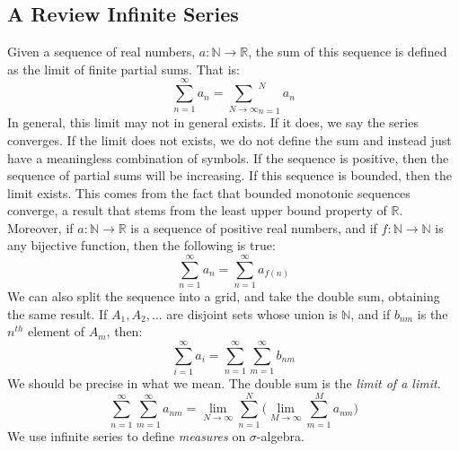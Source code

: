 \documentclass[crop=false,class=book,oneside]{standalone}
\begin{document}
        \subsection{A Review Infinite Series}
            Given a sequence of real numbers,
            $a:\mathbb{N}\rightarrow\mathbb{R}$, the sum of this
            sequence is defined as the limit of
            finite partial sums. That is:
            \begin{equation}
                \sum_{n=1}^{\infty}a_{n}=
                \underset{N\rightarrow\infty}\sum_{n=1}^{N}a_{n}
            \end{equation}
            In general, this limit may not in general exists. If it
            does, we say the series converges. If the limit does
            not exists, we do not define the sum and instead just
            have a meaningless combination of symbols. If the
            sequence is positive, then the sequence of partial sums
            will be increasing. If this sequence is bounded, then
            the limit exists. This comes from the fact that bounded
            monotonic sequences converge, a result that stems from
            the least upper bound property of $\mathbb{R}$.
            Moreover, if $a:\mathbb{N}\rightarrow\mathbb{R}$ is a
            sequence of positive real numbers, and if
            $f:\mathbb{N}\rightarrow\mathbb{N}$ is any bijective
            function, then the following is true:
            \begin{equation}
                \sum_{n=1}^{\infty}a_{n}
                =\sum_{n=1}^{\infty}a_{f(n)}
            \end{equation}
            We can also split the sequence into a grid,
            and take the
            double sum, obtaining the same result. If
            $A_{1},A_{2},\hdots$ are disjoint sets whose union is
            $\mathbb{N}$, and if $b_{nm}$ is the $n^{th}$ element
            of $A_{m}$, then:
            \begin{equation}
                \sum_{i=1}^{\infty}a_{i}=
                \sum_{n=1}^{\infty}\sum_{m=1}^{\infty}b_{nm}
            \end{equation}
            We should be precise in what we mean. The double
            sum is the \textit{limit of a limit}.
            \begin{equation}
                \sum_{n=1}^{\infty}\sum_{m=1}^{\infty}a_{nm}
                =\underset{N\rightarrow\infty}{\lim}\sum_{n=1}^{N}
                \Big(\underset{M\rightarrow\infty}{\lim}
                \sum_{m=1}^{M}a_{nm}\Big)
            \end{equation}
            We use infinite series to define \textit{measures} on
            $\sigma$-algebra.
\end{document}
